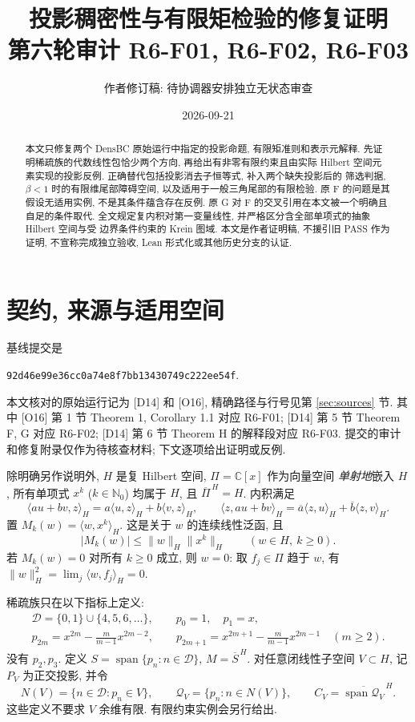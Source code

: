 \documentclass[UTF8,11pt]{ctexart}
\title{投影稠密性与有限矩检验的修复证明\\
\large 第六轮审计 R6-F01, R6-F02, R6-F03}
\author{作者修订稿: 待协调器安排独立无状态审查}
\date{2026-09-21}
\theoremstyle{definition}
\DeclareMathOperator{\Span}{span}
\newcommand{\ip}[2]{\langle #1,#2\rangle_H}
\newcommand{\clspan}[1]{\overline{\Span #1}^{\,H}}
\newcommand{\D}{\mathcal D}
\newcommand{\Q}{\mathcal Q}
\begin{document}
\maketitle
\begin{abstract}
本文只修复两个 DensBC 原始运行中指定的投影命题, 有限矩准则和表示元解释.
先证明稀疏族的代数线性包恰少两个方向, 再给出有非零有限约束且由实际 Hilbert
空间元素实现的投影反例. 正确替代包括投影消去子恒等式, 补入两个缺失投影后的
筛选判据, $\beta<1$ 时的有限维尾部障碍空间, 以及适用于一般三角尾部的有限检验.
原 F 的问题是其假设无适用实例, 不是其条件蕴含存在反例.
原 G 对 F 的交叉引用在本文被一个明确且自足的条件取代.
全文规定复内积对第一变量线性, 并严格区分含全部单项式的抽象 Hilbert 空间与受
边界条件约束的 Krein 图域. 本文是作者证明稿, 不援引旧 PASS 作为证明,
不宣称完成独立验收, Lean 形式化或其他历史分支的认证.
\end{abstract}

\tableofcontents

\section{契约, 来源与适用空间}\label{sec:contract}

基线提交是
\begin{center}
\texttt{92d46e99e36cc0a74e8f7bb13430749c222ee54f}.
\end{center}
本文核对的原始运行记为 [D14] 和 [O16], 精确路径与行号见第
\ref{sec:sources} 节. 其中 [O16] 第 1 节 Theorem 1, Corollary 1.1
对应 R6-F01; [D14] 第 5 节 Theorem F, G 对应 R6-F02;
[D14] 第 6 节 Theorem H 的解释段对应 R6-F03.
提交的审计和修复附录仅作为待核查材料; 下文逐项给出证明或反例.

除明确另作说明外, $H$ 是复 Hilbert 空间, $\Pi=\mathbb C[x]$ 作为向量空间
\emph{单射地}嵌入 $H$, 所有单项式 $x^k$ ($k\in\mathbb N_0$) 均属于 $H$,
且 $\overline\Pi^{\,H}=H$. 内积满足
\[
 \ip{a u+b v}{z}=a\ip{u}{z}+b\ip{v}{z},\qquad
 \ip{z}{a u+b v}=\overline a\ip{z}{u}+\overline b\ip{z}{v}.
\]
置 $M_k(w)=\ip{w}{x^k}$. 这是关于 $w$ 的连续线性泛函, 且
\begin{equation}\label{eq:cs}
 |M_k(w)|\leq \|w\|_H\|x^k\|_H\qquad(w\in H,\ k\geq0).
\end{equation}
若 $M_k(w)=0$ 对所有 $k\geq0$ 成立, 则 $w=0$: 取 $f_j\in\Pi$ 趋于 $w$,
有 $\|w\|_H^2=\lim_j\ip{w}{f_j}=0$.

稀疏族只在以下指标上定义:
\begin{equation}\label{eq:sparse}
 \begin{gathered}
 \D=\{0,1\}\cup\{4,5,6,\ldots\},\qquad p_0=1,\quad p_1=x,\\
 p_{2m}=x^{2m}-\frac{m}{m-1}x^{2m-2},\qquad
 p_{2m+1}=x^{2m+1}-\frac{m}{m-1}x^{2m-1}\quad(m\geq2).
 \end{gathered}
\end{equation}
没有 $p_2,p_3$. 定义 $S=\Span\{p_n:n\in\D\}$, $M=\overline S^{\,H}$.
对任意闭线性子空间 $V\subset H$, 记 $P_V$ 为正交投影, 并令
\begin{equation}\label{eq:kept}
 N(V)=\{n\in\D:p_n\in V\},\qquad
 \Q_V=\{p_n:n\in N(V)\},\qquad C_V=\clspan{\Q_V}.
\end{equation}
这些定义不要求 $V$ 余维有限. 有限约束实例会另行给出.
\end{document}
